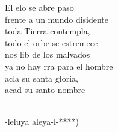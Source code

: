 \begin{cancion}
\jump
	El elo se abre paso \\
frente a un mundo disidente\\
	toda  Tierra contempla, \\
todo el orbe se estremece\\
	nos lib de los malvados  \\
	ya no hay rra para el hombre\\
	acla su santa gloria,\\
	 acad su santo nombre\\\jump\\
	\begin{chorus}%
	-leluya aleya-l-*)\\
	\end{chorus}%
	\jump\\
\end{cancion}%
